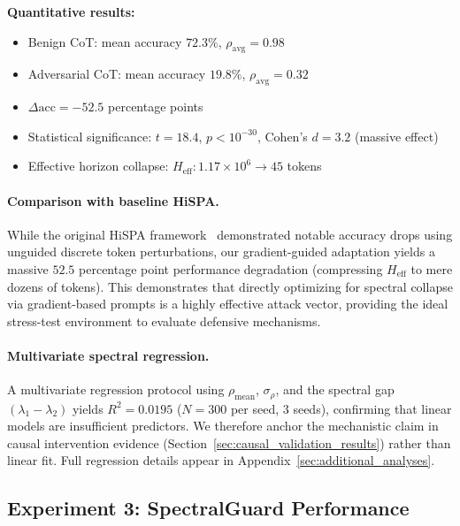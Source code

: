 \documentclass[10pt,twocolumn]{article}
\begin{document}
\textbf{Quantitative results:}
\begin{itemize}
\item Benign CoT: mean accuracy $72.3\%$, $\rho_{\text{avg}} = 0.98$
\item Adversarial CoT: mean accuracy $19.8\%$, $\rho_{\text{avg}} = 0.32$
\item $\Delta\text{acc} = -52.5$ percentage points
\item Statistical significance: $t = 18.4$, $p < 10^{-30}$, Cohen's $d = 3.2$ (massive effect)
\item Effective horizon collapse: $H_{\text{eff}}: 1.17 \times 10^6 \to 45$ tokens
\end{itemize}

\paragraph{Comparison with baseline HiSPA.}
While the original HiSPA framework~\cite{lemercier2026hispa} demonstrated notable accuracy drops using unguided discrete token perturbations, our gradient-guided adaptation yields a massive $52.5$ percentage point performance degradation (compressing $H_{\text{eff}}$ to mere dozens of tokens). This demonstrates that directly optimizing for spectral collapse via gradient-based prompts is a highly effective attack vector, providing the ideal stress-test environment to evaluate defensive mechanisms. %

\paragraph{Multivariate spectral regression.}
A multivariate regression protocol using $\rho_{\text{mean}}$, $\sigma_{\rho}$, and the spectral gap $(\lambda_1{-}\lambda_2)$ yields $R^2{=}0.0195$ ($N{=}300$ per seed, 3 seeds), confirming that linear models are insufficient predictors. We therefore anchor the mechanistic claim in causal intervention evidence (Section~\ref{sec:causal_validation_results}) rather than linear fit. Full regression details appear in Appendix~\ref{sec:additional_analyses}.

\subsection{Experiment 3: SpectralGuard Performance}
\end{document}
